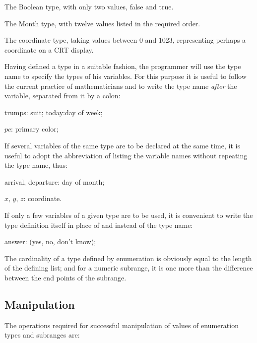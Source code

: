 \quad The Boolean type, with only two values, false and true.

\quad The Month type, with twelve values listed in the required order.

\parindent\quad The coordinate type, taking values between 0 and 1023, representing perhaps a coordinate on a CRT display.

Having defined a type in a suitable fashion, the programmer will use the type name to specify the types of his variables. For this purpose it is useful to follow the current practice of mathematicians and to write the type name \textit{after} the variable, separated from it by a colon:

\quad trumps: suit; today:day of week;

\quad $pc$: primary color;

\noindent
If several variables of the same type are to be declared at the same time, it is useful to adopt the abbreviation of listing the variable names without repeating the type name, thus:

\quad arrival, departure: day of month;

\quad $x$, $y$, $z$: coordinate.

\noindent
If only a few variables of a given type are to be used, it is convenient to write the type definition itself in place of and instead of the type name:

\quad answer: (yes, no, don't know);

The cardinality of a type defined by enumeration is obviously equal to the length of the defining list; and for a numeric subrange, it is one more than the difference between the end points of the subrange.

\subsection{Manipulation}

The operations required for successful manipulation of values of enumeration types and subranges are:

